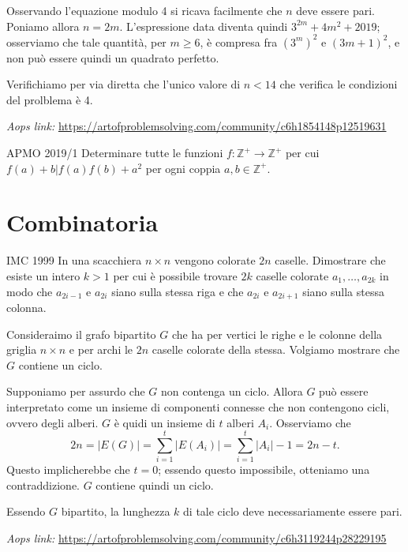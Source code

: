 \documentclass{article}
\begin{document}
Osservando l'equazione modulo 4 si ricava facilmente
che $n$ deve essere pari. Poniamo allora $n=2m$.
L'espressione data diventa quindi $3^{2m}+4m^2+2019$;
osserviamo che tale quantità, per $m\ge 6$,
è compresa fra $(3^m)^2$ e $(3m+1)^2$, e non può essere quindi
un quadrato perfetto.

Verifichiamo per via diretta che l'unico valore di $n<14$
che verifica le condizioni del prolblema è 4.

\vspace{0.5cm}
\textit{Aops link:}
\href{https://artofproblemsolving.com/community/c6h1854148p12519631}
{https://artofproblemsolving.com/community/c6h1854148p12519631}

\begin{proposition}{APMO 2019/1}{}
	Determinare tutte le funzioni $f:\mathbb{Z^+}\rightarrow\mathbb{Z^+}$
	per cui $f(a)+b\vert f(a)f(b)+a^2$ per ogni coppia $a,b\in \mathbb{Z^+}$.
\end{proposition}

\newpage
\section{Combinatoria}
\begin{proposition}{IMC 1999}{}
	In una scacchiera $n\times n$ vengono colorate  $2n$ caselle.
	Dimostrare che esiste un intero $k>1$ per cui è possibile trovare $2k$
	caselle colorate $a_1,\dots,a_{2k}$ in modo che $a_{2i-1}$ e $a_{2i}$
	siano sulla stessa riga e che $a_{2i}$ e $a_{2i+1}$ siano sulla stessa
	colonna.
\end{proposition}
Consideraimo il grafo bipartito $G$ che ha per vertici
le righe e le colonne della griglia $n\times n$ e per archi le $2n$ caselle
colorate della stessa. Volgiamo mostrare che $G$ contiene un ciclo.

Supponiamo per assurdo che $G$ non contenga un ciclo. Allora $G$ può essere
interpretato come un insieme di componenti connesse che non contengono cicli,
ovvero degli alberi. $G$ è quidi un insieme di $t$ alberi $A_i$. Osserviamo che
\[ 
	2n=\vert E(G) \vert = \sum_{i=1}^{t}\vert E(A_i)\vert=
		\sum_{i=1}^{t} \vert A_i \vert -1=2n-t.
\]
Questo implicherebbe che $t=0$; essendo questo impossibile, otteniamo una
contraddizione. $G$ contiene quindi un ciclo.

Essendo $G$ bipartito, la lunghezza $k$ di tale ciclo deve necessariamente
essere pari.

\vspace{0.5cm}
\textit{Aops link:}
\href{https://artofproblemsolving.com/community/c6h3119244p28229195}
{https://artofproblemsolving.com/community/c6h3119244p28229195}
\end{document}

